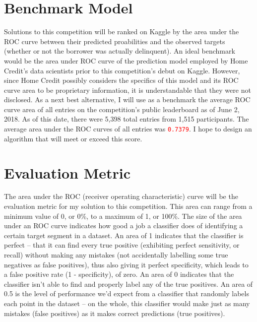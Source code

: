 \documentclass[12pt, letterpaper]{article}
\begin{document}
\section{Benchmark Model}
Solutions to this competition will be ranked on Kaggle by the area under the ROC curve between their predicted proabilities and the observed targets (whether or not the borrower was actually delinquent). An ideal benchmark would be the area under ROC curve of the prediction model employed by Home Credit's data scientists prior to this competition's debut on Kaggle. However, since Home Credit possibly considers the specifics of this model and its ROC curve area to be proprietary information, it is understandable that they were not disclosed. As a next best alternative, I will use as a benchmark the average ROC curve area of all entries on the competition's public leaderboard\cite{kagglehomecreditcompetitionpublicleaderboard} as of June 2, 2018. As of this date, there were 5,398 total entries from 1,515 participants. The average area under the ROC curves of all entries was \colorbox{backcolor}{\textcolor{red}{\texttt{0.7379}}}. I hope to design an algorithm that will meet or exceed this score.

\section{Evaluation Metric}
The area under the ROC (receiver operating characteristic) curve\cite{wikipediaroc} will be the evaluation metric for my solution to this competition. This area can range from a minimum value of 0, or 0\%, to a maximum of 1, or 100\%. The size of the area under an ROC curve indicates how good a job a classifier does of identifying a certain target segment in a dataset. An area of 1 indicates that the classifier is perfect -- that it can find every true positive (exhibiting perfect sensitivity, or recall) without making any mistakes (not accidentally labelling some true negatives as false positives), thus also giving it perfect specificity, which leads to a false positive rate (1 - specificity), of zero. An area of 0 indicates that the classifier isn't able to find and properly label any of the true positives. An area of 0.5 is the level of performance we'd expect from a classifier that randomly labels each point in the dataset -- on the whole, this classifier would make just as many mistakes (false positives) as it makes correct predictions (true positives).
\end{document}
